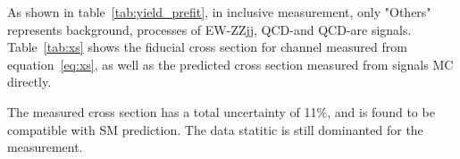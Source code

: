 As shown in table~\ref{tab:yield_prefit}, in inclusive measurement, only "Others" represents background, 
processes of EW-ZZjj, QCD-\qqZZ and QCD-\ggZZ are signals.
Table~\ref{tab:xs} shows the fiducial cross section for \llll channel measured from equation~\ref{eq:xs}, 
as well as the predicted cross section measured from signals MC directly.
\begin{table}[!htbp]
\begin{center}
\end{center}
\caption{
Measured and predicted fiducial cross-sections in \lllljj final-state.
Uncertainties due to different sources are presented.
}
\label{tab:xs}
\end{table}
The measured cross section has a total uncertainty of 11\%, and is found to be compatible with SM prediction.
The data statitic is still dominanted for the measurement.
